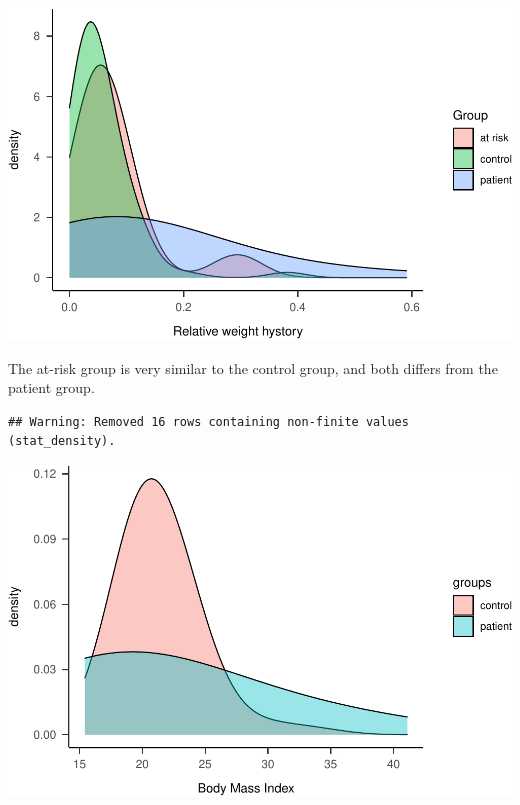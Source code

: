 \documentclass[
]{article}
\newenvironment{Shaded}{\begin{snugshade}}{\end{snugshade}}
\newcommand{\CommentTok}[1]{\textcolor[rgb]{0.56,0.35,0.01}{\textit{#1}}}
\newcommand{\DecValTok}[1]{\textcolor[rgb]{0.00,0.00,0.81}{#1}}
\newcommand{\FunctionTok}[1]{\textcolor[rgb]{0.00,0.00,0.00}{#1}}
\newcommand{\NormalTok}[1]{#1}
\newcommand{\OtherTok}[1]{\textcolor[rgb]{0.56,0.35,0.01}{#1}}
\newcommand{\SpecialCharTok}[1]{\textcolor[rgb]{0.00,0.00,0.00}{#1}}
\begin{document}
\includegraphics{046_weight_history_alpha_files/figure-latex/unnamed-chunk-6-1.pdf}

The at-risk group is very similar to the control group, and both differs
from the patient group.

\begin{Shaded}
\end{Shaded}

\begin{verbatim}
## Warning: Removed 16 rows containing non-finite values (stat_density).
\end{verbatim}

\includegraphics{046_weight_history_alpha_files/figure-latex/unnamed-chunk-8-1.pdf}
\end{document}
